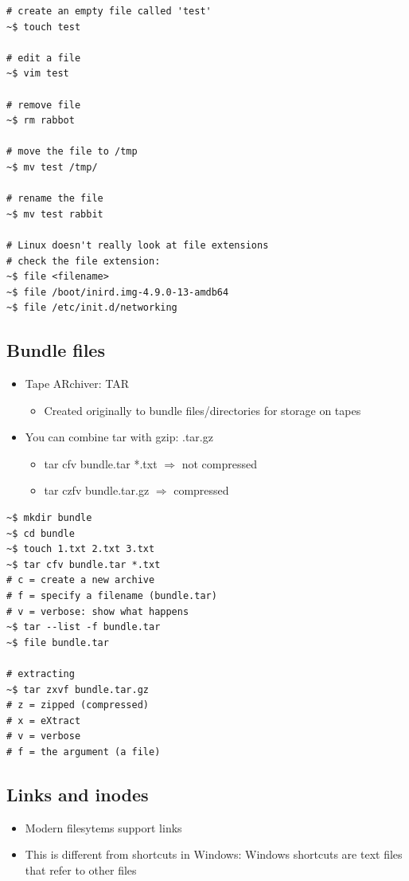 \documentclass{article}
\begin{document}
\begin{verbatim}
# create an empty file called 'test'
~$ touch test

# edit a file
~$ vim test

# remove file
~$ rm rabbot

# move the file to /tmp
~$ mv test /tmp/

# rename the file
~$ mv test rabbit

# Linux doesn't really look at file extensions
# check the file extension:
~$ file <filename>
~$ file /boot/inird.img-4.9.0-13-amdb64
~$ file /etc/init.d/networking
\end{verbatim}

\subsection{Bundle files}

\begin{itemize}
    \item Tape ARchiver: TAR
    \begin{itemize}
        \item Created originally to bundle files/directories for storage on tapes
    \end{itemize}
    \item You can combine tar with gzip: .tar.gz
    \begin{itemize}
        \item tar cfv bundle.tar *.txt $\Rightarrow$ not compressed
        \item tar czfv bundle.tar.gz $\Rightarrow$ compressed
    \end{itemize}
\end{itemize}

\begin{verbatim}
~$ mkdir bundle
~$ cd bundle
~$ touch 1.txt 2.txt 3.txt
~$ tar cfv bundle.tar *.txt
# c = create a new archive
# f = specify a filename (bundle.tar)
# v = verbose: show what happens
~$ tar --list -f bundle.tar
~$ file bundle.tar

# extracting
~$ tar zxvf bundle.tar.gz
# z = zipped (compressed)
# x = eXtract
# v = verbose
# f = the argument (a file) 
\end{verbatim}

\subsection{Links and inodes}

\begin{itemize}
    \item Modern filesytems support links
    \item This is different from shortcuts in Windows: Windows shortcuts are text files that refer to other files
\end{itemize}
\end{document}
